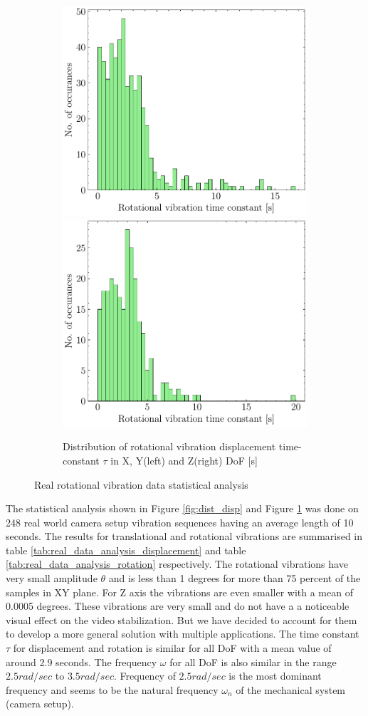 \begin{figure}[H]
    \begin{subfigure}{\linewidth}
    \includegraphics[width=.5\linewidth]{images/fig_chapter4/data_dist/11.pdf}\hfill
    \includegraphics[width=.5\linewidth]{images/fig_chapter4/data_dist/12.pdf}
    \caption{Distribution of rotational vibration displacement time-constant $ \tau $ in X, Y(left) and Z(right) DoF [s]}
    \end{subfigure}

\caption{Real rotational vibration data statistical analysis}
\label{fig:dist_rot}
\end{figure}


The statistical analysis shown in Figure \ref{fig:dist_disp} and Figure \ref{fig:dist_rot} was done on 248 real world camera setup vibration sequences having an average length of 10 seconds. The results for translational and rotational vibrations are summarised in table \ref{tab:real_data_analysis_displacement} and table \ref{tab:real_data_analysis_rotation} respectively. The rotational vibrations have very small amplitude $ \theta $ and is less than 1 degrees for more than 75 percent of the samples in XY plane. For Z axis the vibrations are even smaller with a mean of 0.0005 degrees. These vibrations are very small and do not have a a noticeable visual effect on the video stabilization. But we have decided to account for them to develop a more general solution with multiple applications. The time constant $ \tau $ for displacement and rotation is similar for all DoF with a mean value of around 2.9 seconds.  The frequency $ \omega $ for all DoF is also similar in the range $ 2.5 rad/sec $ to $ 3.5 rad/sec $. Frequency of $ 2.5 rad/sec $ is the most dominant frequency and seems to be the natural frequency $ \omega_n $ of the mechanical system (camera setup).


